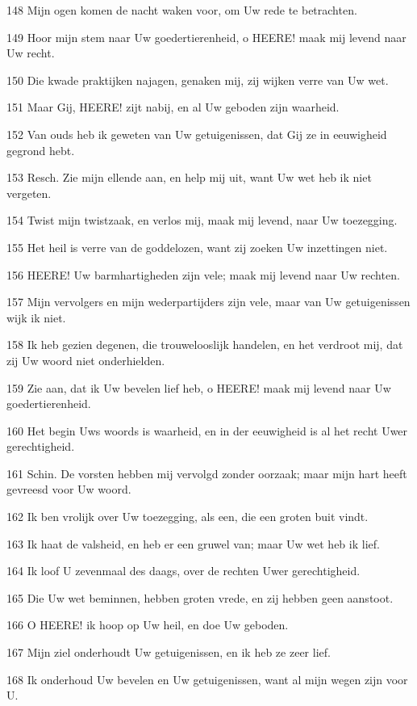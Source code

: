 \par 148 Mijn ogen komen de nacht waken voor, om Uw rede te betrachten.
\par 149 Hoor mijn stem naar Uw goedertierenheid, o HEERE! maak mij levend naar Uw recht.
\par 150 Die kwade praktijken najagen, genaken mij, zij wijken verre van Uw wet.
\par 151 Maar Gij, HEERE! zijt nabij, en al Uw geboden zijn waarheid.
\par 152 Van ouds heb ik geweten van Uw getuigenissen, dat Gij ze in eeuwigheid gegrond hebt.
\par 153 Resch. Zie mijn ellende aan, en help mij uit, want Uw wet heb ik niet vergeten.
\par 154 Twist mijn twistzaak, en verlos mij, maak mij levend, naar Uw toezegging.
\par 155 Het heil is verre van de goddelozen, want zij zoeken Uw inzettingen niet.
\par 156 HEERE! Uw barmhartigheden zijn vele; maak mij levend naar Uw rechten.
\par 157 Mijn vervolgers en mijn wederpartijders zijn vele, maar van Uw getuigenissen wijk ik niet.
\par 158 Ik heb gezien degenen, die trouwelooslijk handelen, en het verdroot mij, dat zij Uw woord niet onderhielden.
\par 159 Zie aan, dat ik Uw bevelen lief heb, o HEERE! maak mij levend naar Uw goedertierenheid.
\par 160 Het begin Uws woords is waarheid, en in der eeuwigheid is al het recht Uwer gerechtigheid.
\par 161 Schin. De vorsten hebben mij vervolgd zonder oorzaak; maar mijn hart heeft gevreesd voor Uw woord.
\par 162 Ik ben vrolijk over Uw toezegging, als een, die een groten buit vindt.
\par 163 Ik haat de valsheid, en heb er een gruwel van; maar Uw wet heb ik lief.
\par 164 Ik loof U zevenmaal des daags, over de rechten Uwer gerechtigheid.
\par 165 Die Uw wet beminnen, hebben groten vrede, en zij hebben geen aanstoot.
\par 166 O HEERE! ik hoop op Uw heil, en doe Uw geboden.
\par 167 Mijn ziel onderhoudt Uw getuigenissen, en ik heb ze zeer lief.
\par 168 Ik onderhoud Uw bevelen en Uw getuigenissen, want al mijn wegen zijn voor U.

